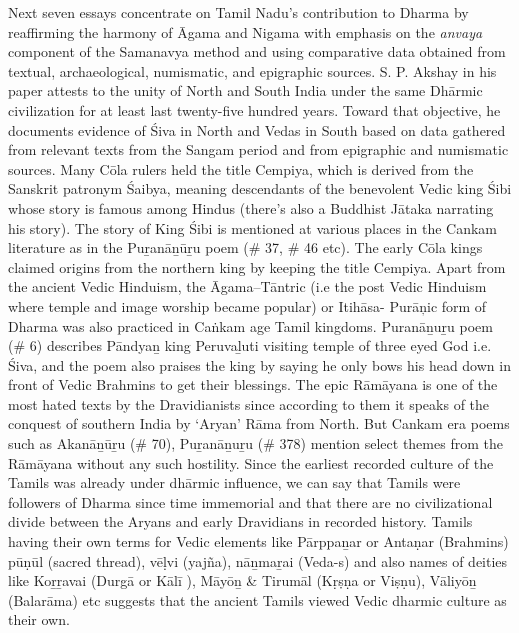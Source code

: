 Next seven essays concentrate on Tamil Nadu’s contribution to Dharma by reaffirming the harmony of Āgama and Nigama with emphasis on the \textit{anvaya} component of the Samanavya method and using comparative data obtained from textual, archaeological, numismatic, and epigraphic sources. S. P. Akshay in his paper attests to the unity of North and South India under the same Dhārmic civilization for at least last twenty-five hundred years. Toward that objective, he documents evidence of Śiva in North and Vedas in South based on data gathered from relevant texts from the Sangam period and from epigraphic and numismatic sources. Many Cōla rulers held the title Cempiya, which is derived from the Sanskrit patronym Śaibya, meaning descendants of the benevolent Vedic king Śibi whose story is famous among Hindus (there's also a Buddhist Jātaka narrating his story). The story of King Śibi is mentioned at various places in the Cankam literature as in the Puṟanāṉūṟu poem (\# 37, \# 46 etc). The early Cōla kings claimed origins from the northern king by keeping the title Cempiya. Apart from the ancient Vedic Hinduism, the Āgama--Tāntric (i.e the post Vedic Hinduism where temple and image worship became popular) or Itihāsa- Purāņic form of Dharma was also practiced in Caṅkam age Tamil kingdoms. Puranāṉuṟu poem (\# 6) describes Pāndyaṉ king Peruvaḻuti visiting temple of three eyed God i.e. Śiva, and the poem also praises the king by saying he only bows his head down in front of Vedic Brahmins to get their blessings. The epic Rāmāyana is one of the most hated texts by the Dravidianists since according to them it speaks of the conquest of southern India by ‘Aryan’ Rāma from North. But Cankam era poems such as Akanāṉūṟu (\# 70), Puṟanāṉuṟu (\# 378) mention select themes from the Rāmāyana without any such hostility. Since the earliest recorded culture of the Tamils was already under dhārmic influence, we can say that Tamils were followers of Dharma since time immemorial and that there are no civilizational divide between the Aryans and early Dravidians in recorded history. Tamils having their own terms for Vedic elements like Pārppaṉar or Antaṇar (Brahmins) pūṇūl (sacred thread), vēḷvi (yajña), nāṉmaṟai (Veda-s) and also names of deities like Koṟṟavai (Durgā or Kālī ), Māyōṉ \& Tirumāl (Kṛṣṇa or Viṣṇu), Vāliyōṉ (Balarāma) etc suggests that the ancient Tamils viewed Vedic dharmic culture as their own.

